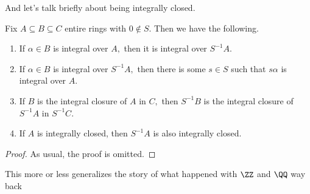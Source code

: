 \documentclass[../notes.tex]{subfiles}
\begin{document}
And let's talk briefly about being integrally closed.
\begin{proposition}
    Fix $A\subseteq B\subseteq C$ entire rings with $0\notin S.$ Then we have the following.
    \begin{enumerate}
        \item If $\alpha\in B$ is integral over $A,$ then it is integral over $S^{-1}A.$
        \item If $\alpha\in B$ is integral over $S^{-1}A,$ then there is some $s\in S$ such that $s\alpha$ is integral over $A.$
        \item If $B$ is the integral closure of $A$ in $C,$ then $S^{-1}B$ is the integral closure of $S^{-1}A$ in $S^{-1}C.$
        \item If $A$ is integrally closed, then $S^{-1}A$ is also integrally closed.
    \end{enumerate}
\end{proposition}
\begin{proof}
    As usual, the proof is omitted.
\end{proof}
\begin{remark}
    This more or less generalizes the story of what happened with $\ZZ$ and $\QQ$ way back
\end{remark}
\end{document}
